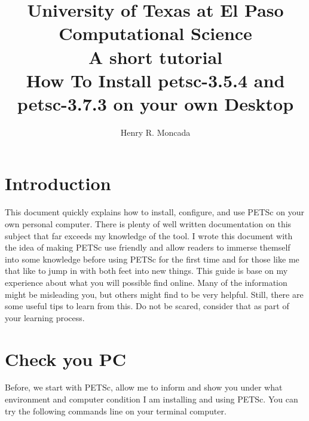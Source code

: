 \documentclass{article}
\begin{document}
\title{ University of Texas at El Paso\\
Computational Science\\
A short tutorial\\
How To Install petsc-3.5.4 and petsc-3.7.3 on your own Desktop}
\author{Henry R. Moncada}
\maketitle
\tableofcontents        %





\section{Introduction}	
This document quickly explains how to install, configure, and use PETSc on your own personal computer. There is plenty of well written documentation on this subject
that far exceeds my knowledge of the tool. I wrote this document with the idea of making PETSc use friendly and allow readers to immerse themself into some knowledge
before using PETSc for the first time and for those like me that like to jump in with both feet into new things.
This guide is base on my experience about what you will possible find online. Many of the information might be  misleading you, but others might find to be very helpful. Still,
there are some useful tips to learn from this. Do not be scared, consider that as part of your learning process.

\section{Check you PC}
Before, we start with PETSc, allow me to inform and show you under what environment and computer condition I am installing and using PETSc. You can try the following commands line on your terminal computer.
\end{document}
